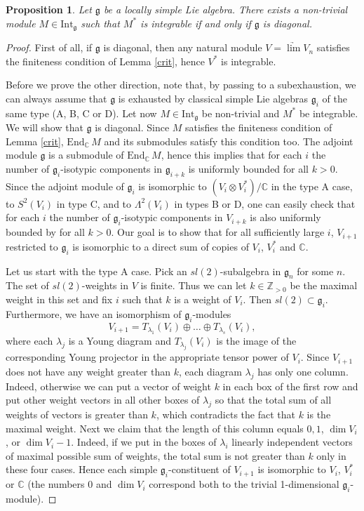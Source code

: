 \documentclass{birkmult}
\newcounter{theorem}
\newtheorem{prop}[theo]{Proposition}
\newcommand {\ZZ} {\mathbb {Z}}
\newcommand {\CC} {\mathbb {C}}
\newcommand {\End} {\mathrm{End}}
\renewcommand{\gg}{\mathfrak{g}}
\newcommand{\ds}{\displaystyle}
\newcommand{\Int}{\mathrm{Int}}
\begin{document}
\begin{prop}\label{diag} Let $\gg$ be a locally simple Lie algebra.
There exists a non-trivial module $M\in\Int_{\gg}$ such that $M^*$
  is integrable if and only if $\gg$ is diagonal.
\end{prop}
\begin{proof}
First of all, if $\gg$ is diagonal, then any natural module $\ds
V=\underrightarrow{\lim}V_n$ satisfies the finiteness condition of
Lemma \ref{crit}, hence $V^*$ is integrable.

Before we prove the other direction, note that, by passing to a
subexhaustion, we can always assume that $\gg$ is exhausted by
classical simple Lie algebras $\gg_i$ of the same type (A, B, C or
D). Let now $M\in\Int_\gg$ be non-trivial and $M^*$ be
integrable. We will show that $\gg$ is diagonal. Since $M$
satisfies the finiteness condition of Lemma \ref{crit},
$\End_\CC\,M$ and its submodules satisfy this condition too. The 
adjoint module $\gg$ is a submodule of $\End_\CC\,M$, hence this
implies that for each $i$ the number of $\gg_i$-isotypic
components in $\gg_{i+k}$ is uniformly bounded for all $k>0$.
Since the adjoint module of $\gg_i$ is isomorphic to $(V_i\otimes
V_i^*)/\mathbb C$ in the type A case, to $S^2(V_i)$ in type C, and to
$\Lambda^2(V_i)$ in types B or D, one can easily check that for
each $i$ the number of $\gg_i$-isotypic components in $V_{i+k}$ is
also uniformly bounded by for all $k>0$. Our goal is to show that
for all sufficiently large $i$, $V_{i+1}$ restricted to $\gg_i$ is
isomorphic to a direct sum of copies of $V_i$, $V_i^*$ and
$\mathbb C$.

Let us start with the type A case. Pick an $sl(2)$-subalgebra in
$\gg_n$ for some $n$. The set of $sl(2)$-weights in $V$ is finite.
Thus we can let $k\in\ZZ_{>0}$ be the maximal weight in this set
and fix $i$ such that $k$ is a weight of $V_i$. Then
$sl(2)\subset\gg_i$. Furthermore, we have an isomorphism of $\gg_i$-modules
$$V_{i+1}=T_{\lambda_1}(V_i)\oplus\dots\oplus T_{\lambda_s}(V_i),$$
where each $\lambda_j$ is a Young diagram and $T_{\lambda_j}(V_i)$ is
the image of the corresponding Young projector in the appropriate
tensor power of $V_i$. Since $V_{i+1}$ does not have any weight
greater than $k$, each diagram $\lambda_j$ has only one column. Indeed,
otherwise we can put a vector of weight $k$ in each box of the first row and
put other weight vectors in all other boxes of $\lambda_j$ so that
the total sum of all weights of vectors is greater than $k$, which
contradicts the fact that $k$ is the maximal weight. Next we claim
that the length of this column equals $0, 1$, $\dim V_i$, or $\dim
V_i-1$. Indeed, if we put in the boxes of $\lambda_i$ linearly
independent vectors of maximal possible sum of weights, the total
sum is not greater than $k$ only in these four cases. Hence each
simple $\gg_i$-constituent of $V_{i+1}$ is isomorphic to $V_i$,
$V_i^*$ or $\mathbb C$ (the numbers $0$ and $\dim V_i$ correspond both 
to the trivial 1-dimensional $\gg_i$-module).


\end{proof}
\end{document}
